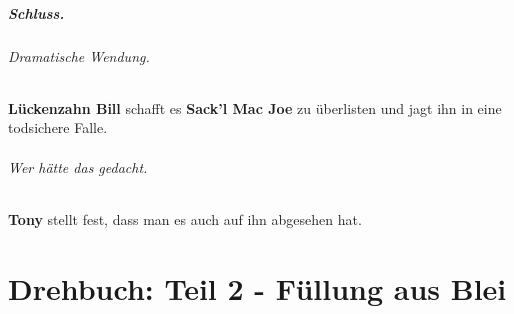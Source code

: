 \documentclass[12pt,a4paper,german]{book}
\begin{document}
\paragraph{Schluss.}
    \subparagraph{Dramatische Wendung.}
    \textbf{Lückenzahn Bill} schafft es \textbf{Sack'l Mac Joe} zu überlisten und jagt ihn in eine todsichere Falle.
    \subparagraph{Wer hätte das gedacht.}
    \textbf{Tony} stellt fest, dass man es auch auf ihn abgesehen hat.

%
%
%
%
%
\chapter{Drehbuch: Teil 2 - Füllung aus Blei}

\end{document}
